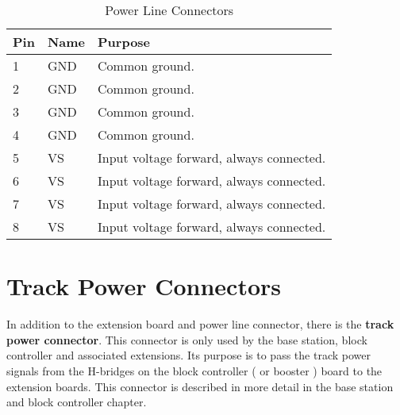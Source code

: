 \begin{table}[h!]
    \begin{center}
        \caption{Power Line Connectors}
        \begin{tabular}{|l|l|p{}|}
            \toprule
            \textbf{Pin} & \textbf{Name} & \textbf{Purpose} \\
            \midrule
            1 & GND & Common ground. \\
            \midrule
            2 & GND & Common ground. \\
            \midrule
            3 & GND & Common ground. \\
            \midrule
            4 & GND & Common ground. \\
            \midrule
            5 & VS & Input voltage forward, always connected. \\
            \midrule
            6 & VS & Input voltage forward, always connected. \\
            \midrule
            7 & VS & Input voltage forward, always connected. \\
            \midrule
            8 & VS & Input voltage forward, always connected. \\
            \bottomrule
        \end{tabular}
    \end{center}
\end{table}

\section{Track Power Connectors}

In addition to the extension board and power line connector, there is the \textbf{track power connector}. This connector is only used by the base station, block controller and associated extensions. Its purpose is to pass the track power signals from the H-bridges on the block controller ( or booster ) board to the extension boards. This connector is described in more detail in the base station and block controller chapter.

